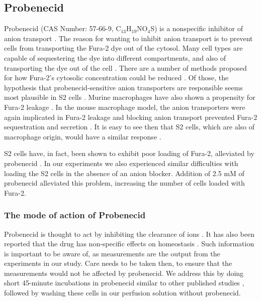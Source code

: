 \subsection{Probenecid}
Probenecid (CAS Number: 57-66-9, C$_{13}$H$_{19}$NO$_4$S) is a nonspecific inhibitor of anion transport \citep{Cordova2003a, Masereeuw2000}. The reason for wanting to inhibit anion transport is to prevent cells from transporting the Fura-2 dye out of the cytosol. Many cell types are capable of sequestering the dye into different compartments, and also of transporting the dye out of the cell \citep{DiVirgilio1990}. There are a number of methods proposed for how Fura-2's cytosolic concentration could be reduced \citep{DiVirgilio1990, Cordova2003a}. Of those, the hypothesis that probenecid-sensitive anion transporters are responsible seems most plausible in \droso{} S2 cells \citep{Cordova2003a}. Murine macrophages have also shown a propensity for Fura-2 leakage \citep{DiVirgilio1990}. In the mouse macrophage model, the anion transporters were again implicated in Fura-2 leakage and blocking anion transport  prevented Fura-2 sequestration and secretion \citep{DiVirgilio1990}. It is easy to see then that S2 cells, which are also of macrophage origin, would have a similar response \citep{Schetz2004}.

\droso{} S2 cells have, in fact, been shown to exhibit poor loading of Fura-2, alleviated by probenecid \citep{Cordova2003a}. In our experiments we also experienced similar difficulties with loading the S2 cells in the absence of an anion blocker. Addition of 2.5 mM of probenecid alleviated this problem, increasing the number of cells loaded with Fura-2.

\subsubsection{The mode of action of Probenecid}
Probenecid is thought to act by inhibiting the clearance of ions \citep{Masereeuw2000}. 
It has also been reported that the drug has non-specific effects %
on \Ca{} homeostasis \citep{Masereeuw2000}. 
Such information is important to be aware of, as \Ca{} measurements are the output from the experiments in our study. 
Care needs to be taken then, to ensure that the \Ca{} measurements would not be affected by probenecid. We address this by doing short 45-minute incubations in probenecid similar to other published studies \citep{Cordova2003a, Roos2005, Yagodin1999}, followed by washing these cells in our perfusion solution without probenecid.

